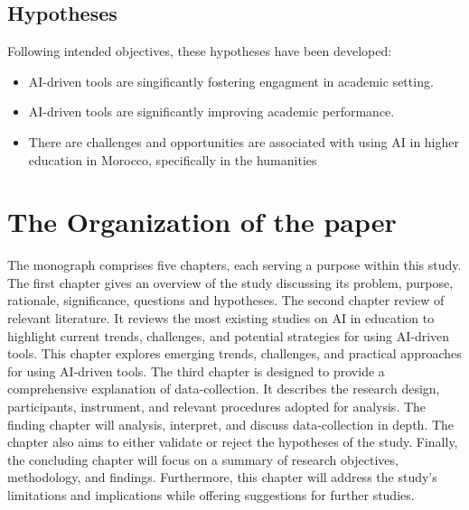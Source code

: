 \subsection{Hypotheses}\label{subsec:hypotheses}
\justifying
\noindent
Following intended objectives, these hypotheses have been developed:
\begin{itemize}
	\item AI-driven tools are singificantly fostering engagment in academic setting.
	\item AI-driven tools are significantly improving academic performance.
	\item There are challenges and opportunities are associated with using AI in higher education
	      in Morocco, specifically in the humanities
\end{itemize}



\section{The Organization of the paper}\label{sec:the-organization-of-the-paper}
\justifying
The monograph comprises five chapters, each serving a purpose within this study.
The first chapter gives an overview of the study discussing its problem,
purpose, rationale, significance, questions and hypotheses.
The second chapter review of relevant literature.
It reviews the most existing studies on AI in education to highlight current
trends, challenges, and potential strategies for using AI-driven tools.
This chapter explores emerging trends, challenges, and practical approaches for using AI-driven tools.
The third chapter is designed to provide a comprehensive explanation of data-collection.
It describes the research design, participants, instrument, and relevant procedures
adopted for analysis.
The finding chapter will analysis, interpret, and discuss data-collection in depth.
The chapter also aims to either validate or reject the hypotheses of the study.
Finally, the concluding chapter will focus on a summary of research objectives, methodology, and findings.
Furthermore,
this chapter will address the study's limitations and implications while offering suggestions for further studies.
